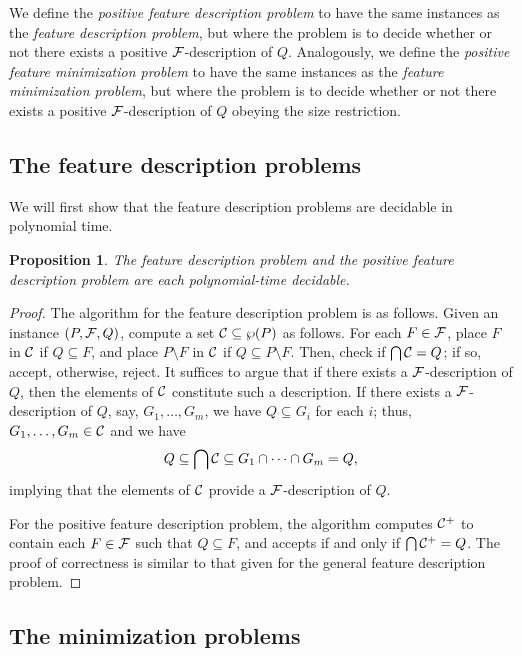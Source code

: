 \documentclass[11pt,a4paper]{article}
\newtheorem{proposition}{Proposition}
\begin{document}
We define the \emph{positive feature description problem}
to have the same instances as the 
\emph{feature description problem},
but where the problem is to decide
whether or not there exists a positive $\mathcal{F}$-description of $Q$.
Analogously, we define the 
\emph{positive feature minimization problem}
to have the same instances as the
\emph{feature minimization problem},
but where the problem is to decide
whether or not there exists a positive $\mathcal{F}$-description
of $Q$ obeying the size restriction.

\subsection{The feature description problems}
\label{sec:featuredescription}

We will first show that the feature description problems are decidable in polynomial time.

\begin{proposition}
	\label{prop:description}
The feature description problem 
and the positive feature description problem
are each polynomial-time decidable.
\end{proposition}

\begin{proof}
The algorithm for the feature description problem
is as follows.  Given an instance
$(P, \mathcal{F}, Q)$,
compute a set $\mathcal{C} \subseteq \wp(P)$
as follows.
For each $F \in \mathcal{F}$, place $F$ in $\mathcal{C}$ if $Q \subseteq F$,
and place $P \setminus F$ in $\mathcal{C}$ if 
$Q \subseteq P \setminus F$.
Then, check if $\bigcap \mathcal{C} = Q$; if so, accept,
otherwise, reject.
It suffices to argue that if there exists a $\mathcal{F}$-description
of $Q$, then the elements of $\mathcal{C}$ constitute such a description.
If there exists a $\mathcal{F}$-description of $Q$,
say, $G_1, \ldots, G_m$,
we have $Q \subseteq G_i$ for each $i$;
thus, $G_1, \ldots, G_m \in \mathcal{C}$
and we have
$$Q \subseteq \bigcap \mathcal{C} \subseteq G_1 \cap \cdots \cap G_m
= Q,$$
implying that the elements of $\mathcal{C}$ 
provide a $\mathcal{F}$-description of $Q$.

For the positive feature description problem,
the algorithm computes $\mathcal{C}^{+}$ to contain
each $F \in \mathcal{F}$ such that $Q \subseteq F$,
and accepts if and only if $\bigcap \mathcal{C}^{+} = Q$.
The proof of correctness is similar to that given
for the general feature description problem.
\end{proof}


\subsection{The minimization problems}
\end{document}
